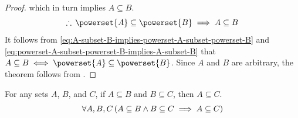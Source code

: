 \begin{proof}
    which in turn implies \( A \subseteq B \).
    \begin{equation}
        \label{eq:powerset-A-subset-powerset-B-implies-A-subset-B}
        \therefore \, \powerset{A} \subseteq \powerset{B} \implies A \subseteq B
    \end{equation}
    It follows from \eqref{eq:A-subset-B-implies-powerset-A-subset-powerset-B} and \eqref{eq:powerset-A-subset-powerset-B-implies-A-subset-B}
    that \( A \subseteq B \iff \powerset{A} \subseteq \powerset{B} \). Since \( A \) and \( B \) are arbitrary, the theorem follows from
    .
\end{proof}

\begin{thm}[Transitivity]
    \label{thm:transitivity-of-the-subset-relation}
    For any sets \( A \), \( B \), and \( C \), if
    \( A \subseteq B \) and \( B \subseteq C \), then
    \( A \subseteq C \).
    \begin{equation*}
        \forall A,B,C \, \mleft( A \subseteq B \land
        B \subseteq C \implies A \subseteq C \mright)
    \end{equation*}
\end{thm}

